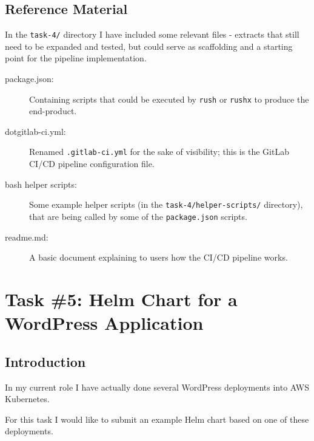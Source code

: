 \documentclass[oneside,titlepage,fleqn,a4paper]{article}
\begin{document}
\subsection{Reference Material}
In the \texttt{task-4/} directory I have included some relevant files - extracts that still need to be expanded and tested, but could serve as scaffolding and a starting point for the pipeline implementation.
\begin{description}
\item[package.json:] Containing scripts that could be executed by \texttt{rush} or \texttt{rushx} to produce the end-product.
\item[dotgitlab-ci.yml:] Renamed \texttt{.gitlab-ci.yml} for the sake of visibility; this is the GitLab CI/CD pipeline configuration file.
\item[bash helper scripts:] Some example helper scripts (in the \texttt{task-4/helper-scripts/} directory), that are being called by some of the \texttt{package.json} scripts.
\item[readme.md:] A basic document explaining to users how the CI/CD pipeline works.
\end{description}

\newpage
\section{Task \#5: Helm Chart for a WordPress Application}
\subsection{Introduction}
In my current role I have actually done several WordPress deployments into AWS Kubernetes.

For this task I would like to submit an example Helm chart based on one of these deployments.
\end{document}
